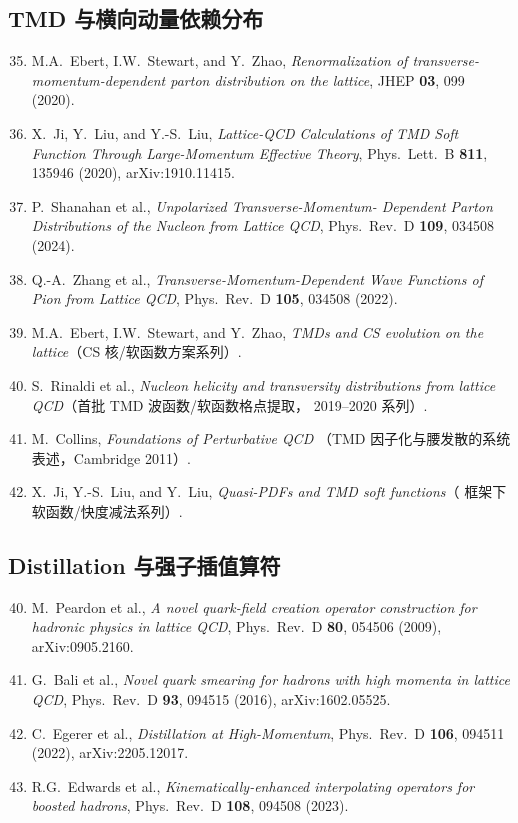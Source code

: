 \documentclass[11pt,a4paper]{ctexart}
\newcommand{\LaMET}{\text{LaMET}}
\begin{document}
\subsection*{TMD 与横向动量依赖分布}
\begin{enumerate}\setcounter{enumi}{34}
  \item M.A.~Ebert, I.W.~Stewart, and Y.~Zhao, \textit{Renormalization
  of transverse-momentum-dependent parton distribution on the lattice},
  JHEP \textbf{03}, 099 (2020).
  \item X.~Ji, Y.~Liu, and Y.-S.~Liu, \textit{Lattice-QCD Calculations
  of TMD Soft Function Through Large-Momentum Effective Theory},
  Phys.\ Lett.\ B \textbf{811}, 135946 (2020), arXiv:1910.11415.
  \item P.~Shanahan et al., \textit{Unpolarized Transverse-Momentum-
  Dependent Parton Distributions of the Nucleon from Lattice QCD},
  Phys.\ Rev.\ D \textbf{109}, 034508 (2024).
  \item Q.-A.~Zhang et al., \textit{Transverse-Momentum-Dependent Wave
  Functions of Pion from Lattice QCD}, Phys.\ Rev.\ D \textbf{105},
  034508 (2022).
  \item M.A.~Ebert, I.W.~Stewart, and Y.~Zhao, \textit{TMDs and CS
  evolution on the lattice}（CS 核/软函数方案系列）.
  \item S.~Rinaldi et al., \textit{Nucleon helicity and transversity
  distributions from lattice QCD}（首批 TMD 波函数/软函数格点提取，
  2019--2020 系列）.
  \item M.~Collins, \textit{Foundations of Perturbative QCD}
  （TMD 因子化与腰发散的系统表述，Cambridge 2011）.
  \item X.~Ji, Y.-S.~Liu, and Y.~Liu, \textit{Quasi-PDFs and TMD soft
  functions}（\LaMET{} 框架下软函数/快度减法系列）.
\end{enumerate}

\subsection*{Distillation 与强子插值算符}
\begin{enumerate}\setcounter{enumi}{39}
  \item M.~Peardon et al., \textit{A novel quark-field creation operator
  construction for hadronic physics in lattice QCD}, Phys.\ Rev.\ D
  \textbf{80}, 054506 (2009), arXiv:0905.2160.
  \item G.~Bali et al., \textit{Novel quark smearing for hadrons with
  high momenta in lattice QCD}, Phys.\ Rev.\ D \textbf{93}, 094515
  (2016), arXiv:1602.05525.
  \item C.~Egerer et al., \textit{Distillation at High-Momentum},
  Phys.\ Rev.\ D \textbf{106}, 094511 (2022), arXiv:2205.12017.
  \item R.G.~Edwards et al., \textit{Kinematically-enhanced
  interpolating operators for boosted hadrons}, Phys.\ Rev.\ D
  \textbf{108}, 094508 (2023).
\end{enumerate}
\end{document}
